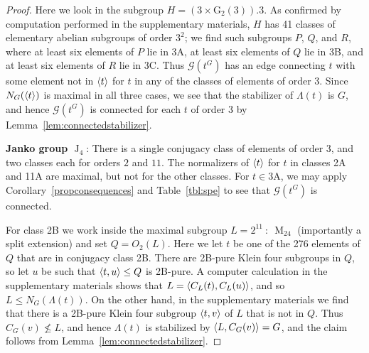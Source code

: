 \documentclass[11pt,a4paper]{amsart}
\theoremstyle{plain}
\theoremstyle{definition}
\theoremstyle{remark}
\newcounter{claim}[definition]
\theoremstyle{remark}
\theoremstyle{remark}
\theoremstyle{definition}
\def\cn{\mathord{{\!\:{:}\:\!}}}
\newcommand{\GG}{\mathcal{G}}
\DeclareMathOperator{\M}{M}
\DeclareMathOperator{\J}{J}
\DeclareMathOperator{\Sym}{Sym}
\DeclarePairedDelimiter{\gen}{\langle}{\rangle}
\begin{document}
\begin{proof}
Here we look in the subgroup $H=(3\times \mathrm G_2(3)).3$. As confirmed by computation performed in the supplementary materials, $H$ has 41 classes of elementary abelian subgroups of order $3^2$; we find such subgroups $P$, $Q$, and $R$, where at least six elements of $P$ lie in 3A, at least six elements of $Q$ lie in 3B, and at least six elements of $R$ lie in 3C. Thus $\GG(t^G)$ has an edge connecting $t$ with some element not in $\gen t$ for $t$ in any of the classes of elements of order $3$. Since $N_G(\gen t)$ is maximal in all three cases, we see that the stabilizer of $\Lambda(t)$ is $G$, and hence $\GG(t^G)$ is connected for each $t$ of order $3$ by Lemma~\ref{lem:connectedstabilizer}.

\medskip

\textbf{Janko group $\J_4$}: There is a single conjugacy class of elements of order $3$, and two classes each for orders $2$ and $11$. The normalizers of $\gen t$ for $t$ in classes 2A and 11A are maximal, but not for the other classes. For $t\in\mathrm{3A}$, we may apply Corollary~\ref{propconsequences} and Table~\ref{tbl:spe} to see that $\GG(t^G)$ is connected.

For class 2B we work inside the maximal subgroup $L=2^{11}\cn\M_{24}$ (importantly a split extension) and set $Q=O_2(L)$. Here we let $t$ be one of the 276 elements of $Q$ that are in conjugacy class 2B. There are 2B-pure Klein four subgroups in $Q$, so let $u$ be such that $\gen{t,u} \leq Q $ is 2B-pure. A computer calculation in the supplementary materials shows that $L=\gen{C_L(t),C_L(u)}$, and so $L\leq N_G(\Lambda(t))$. On the other hand, in the supplementary materials we find that there is a 2B-pure Klein four subgroup $\gen{t,v}$ of $L$ that is not in $Q$. Thus $C_G(v)\not\leq L$, and hence $\Lambda(t)$ is stabilized by $\gen{L,C_G(v)}=G$, and the claim follows from Lemma~\ref{lem:connectedstabilizer}.



\end{proof}
\end{document}
